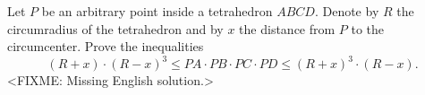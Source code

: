 \problem
Let $P$ be an arbitrary point inside a tetrahedron $ABCD$.
Denote by $R$ the circumradius of the tetrahedron and by $x$ the distance from
$P$ to the circumcenter.
Prove the inequalities
\[
   (R + x) \cdot (R - x)^3
\leq
   PA \cdot PB \cdot PC \cdot PD
\leq
   (R + x)^3 \cdot (R - x)
.\]
\solution
<FIXME: Missing English solution.>
\endproblem
